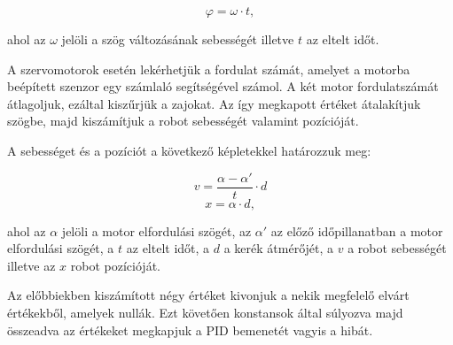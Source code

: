 \begin{equation} \label{szog}
\varphi=\omega \cdot t,
\end{equation}

ahol az $\omega$ jelöli a szög változásának sebességét illetve $t$ az eltelt időt.

A szervomotorok esetén lekérhetjük a fordulat számát, amelyet a motorba beépített szenzor egy számlaló segítségével számol. A két motor fordulatszámát átlagoljuk, ezáltal kiszűrjük a zajokat. Az így megkapott értéket átalakítjuk szögbe, majd kiszámítjuk a robot sebességét valamint pozícióját.

A sebességet és a pozíciót a következő képletekkel határozzuk meg:

\begin{equation} \label{sebesseg}
	v=\frac{\alpha-\alpha'}{t}\cdot d
\end{equation}
\begin{equation} \label{pozicio}
	x=\alpha\cdot d,
\end{equation}

ahol az $\alpha$ jelöli a motor elfordulási szögét, az $\alpha'$ az előző időpillanatban a motor elfordulási szögét, a $t$ az eltelt időt, a $d$ a kerék átmérőjét, a $v$ a robot sebességét illetve az $x$ robot pozícióját.

Az előbbiekben kiszámított négy értéket kivonjuk a nekik megfelelő elvárt értékekből, amelyek nullák. Ezt követően konstansok által súlyozva majd összeadva az értékeket megkapjuk a PID bemenetét vagyis a hibát.